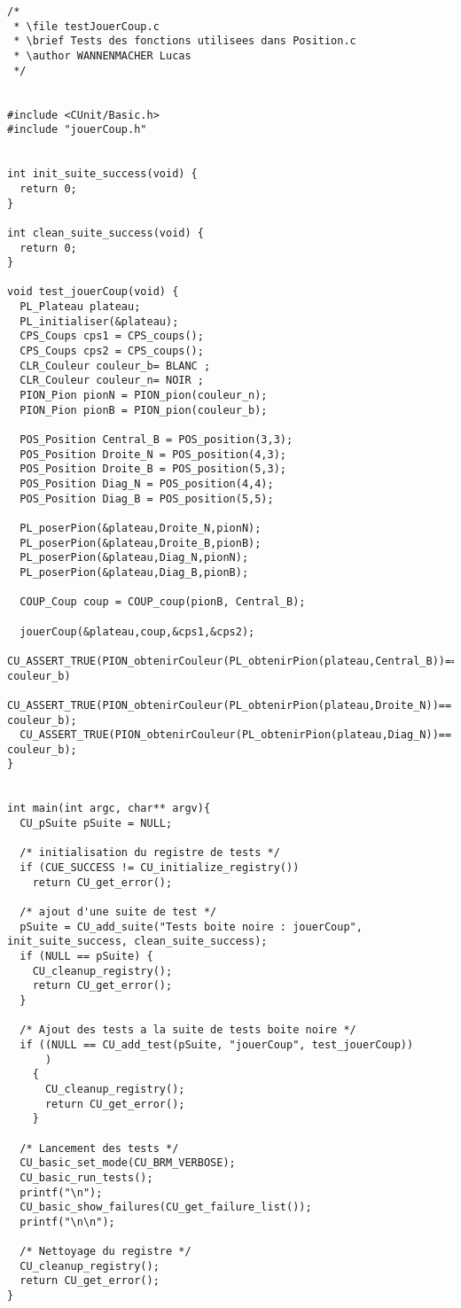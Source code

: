 \begin{lstlisting}
/*
 * \file testJouerCoup.c
 * \brief Tests des fonctions utilisees dans Position.c
 * \author WANNENMACHER Lucas
 */


#include <CUnit/Basic.h>
#include "jouerCoup.h"


int init_suite_success(void) {
  return 0;
}

int clean_suite_success(void) {
  return 0;
}

void test_jouerCoup(void) {
  PL_Plateau plateau;
  PL_initialiser(&plateau);
  CPS_Coups cps1 = CPS_coups();
  CPS_Coups cps2 = CPS_coups();
  CLR_Couleur couleur_b= BLANC ;
  CLR_Couleur couleur_n= NOIR ;
  PION_Pion pionN = PION_pion(couleur_n);
  PION_Pion pionB = PION_pion(couleur_b);

  POS_Position Central_B = POS_position(3,3);
  POS_Position Droite_N = POS_position(4,3);
  POS_Position Droite_B = POS_position(5,3);
  POS_Position Diag_N = POS_position(4,4);
  POS_Position Diag_B = POS_position(5,5);

  PL_poserPion(&plateau,Droite_N,pionN);
  PL_poserPion(&plateau,Droite_B,pionB);
  PL_poserPion(&plateau,Diag_N,pionN);
  PL_poserPion(&plateau,Diag_B,pionB);

  COUP_Coup coup = COUP_coup(pionB, Central_B);

  jouerCoup(&plateau,coup,&cps1,&cps2);
  CU_ASSERT_TRUE(PION_obtenirCouleur(PL_obtenirPion(plateau,Central_B))== couleur_b)
  CU_ASSERT_TRUE(PION_obtenirCouleur(PL_obtenirPion(plateau,Droite_N))== couleur_b);
  CU_ASSERT_TRUE(PION_obtenirCouleur(PL_obtenirPion(plateau,Diag_N))== couleur_b);
}


int main(int argc, char** argv){
  CU_pSuite pSuite = NULL;

  /* initialisation du registre de tests */
  if (CUE_SUCCESS != CU_initialize_registry())
    return CU_get_error();

  /* ajout d'une suite de test */
  pSuite = CU_add_suite("Tests boite noire : jouerCoup", init_suite_success, clean_suite_success);
  if (NULL == pSuite) {
    CU_cleanup_registry();
    return CU_get_error();
  }

  /* Ajout des tests a la suite de tests boite noire */
  if ((NULL == CU_add_test(pSuite, "jouerCoup", test_jouerCoup))
      )
    {
      CU_cleanup_registry();
      return CU_get_error();
    }

  /* Lancement des tests */
  CU_basic_set_mode(CU_BRM_VERBOSE);
  CU_basic_run_tests();
  printf("\n");
  CU_basic_show_failures(CU_get_failure_list());
  printf("\n\n");

  /* Nettoyage du registre */
  CU_cleanup_registry();
  return CU_get_error();
}
\end{lstlisting}

